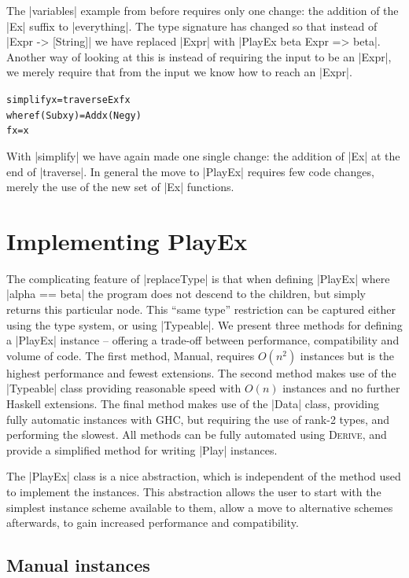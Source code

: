 \documentclass[preprint]{sigplanconf}
\newenvironment{code}{\begin{alltt}\small}{\end{alltt}}
\newcommand{\derive}{\textsc{Derive}}
\begin{document}
The |variables| example from before requires only one change: the addition of the |Ex| suffix to |everything|. The type signature has changed so that instead of |Expr -> [String]| we have replaced |Expr| with |PlayEx beta Expr => beta|. Another way of looking at this is instead of requiring the input to be an |Expr|, we merely require that from the input we know how to reach an |Expr|.

\begin{code}
simplify x = traverseEx f x
    where  f (Sub x y)  = Add x (Neg y)
           f x          = x
\end{code}

With |simplify| we have again made one single change: the addition of |Ex| at the end of |traverse|. In general the move to |PlayEx| requires few code changes, merely the use of the new set of |Ex| functions.

\section{Implementing PlayEx}
\label{sec:implement_playex}

The complicating feature of |replaceType| is that when defining |PlayEx| where |alpha == beta| the program does not descend to the children, but simply returns this particular node. This ``same type'' restriction can be captured either using the type system, or using |Typeable|. We present three methods for defining a |PlayEx| instance -- offering a trade-off between performance, compatibility and volume of code. The first method, Manual, requires $O(n^2)$ instances but is the highest performance and fewest extensions. The second method makes use of the |Typeable| class providing reasonable speed with $O(n)$ instances and no further Haskell extensions. The final method makes use of the |Data| class, providing fully automatic instances with GHC, but requiring the use of rank-2 types, and performing the slowest. All methods can be fully automated using \derive{}, and provide a simplified method for writing |Play| instances.

The |PlayEx| class is a nice abstraction, which is independent of the method used to implement the instances. This abstraction allows the user to start with the simplest instance scheme available to them, allow a move to alternative schemes afterwards, to gain increased performance and compatibility.

\subsection{Manual instances}
\end{document}
